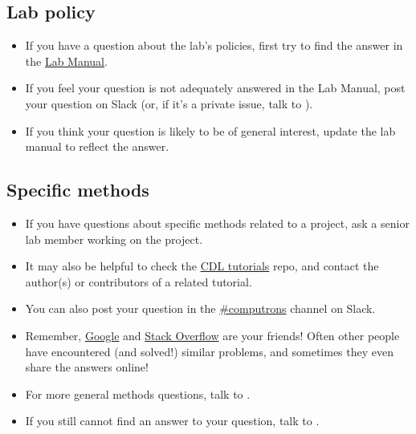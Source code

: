 \documentclass{tufte-book} %
\begin{document}
\subsection{Lab policy}
\begin{itemize}
\item If you have a question about the lab's policies, first try to
  find the answer in the
  \href{https://github.com/ContextLab/lab-manual/tree/master/lab_manual.pdf}{Lab
    Manual}.

\item If you feel your question is not adequately answered in the Lab
  Manual, post your question on Slack (or, if it's a private issue,
  talk to \director).

\item If you think your question is likely to be of general interest,
  update the lab manual to reflect the answer.
\end{itemize}

\subsection{Specific methods}
\begin{itemize}
\item If you have questions about specific methods related to a
  project, ask a senior lab member working on the project.

\item It may also be helpful to check the
  \href{https://github.com/contextLab/cdl-tutorials}{CDL tutorials}
  repo, and contact the author(s) or contributors of a related
  tutorial.

\item You can also post your question in the
  \href{https://context-lab.slack.com/messages/computrons/}{\#computrons}
  channel on Slack.

\item Remember, \href{https://www.google.com/}{Google} and
  \href{https://stackoverflow.com/}{Stack Overflow} are your friends!
  Often other people have encountered (and solved!) similar problems,
  and sometimes they even share the answers online!

\item For more general methods questions, talk to \coordinator.

\item If you still cannot find an answer to your question, talk to \director.
\end{itemize}
\end{document}
